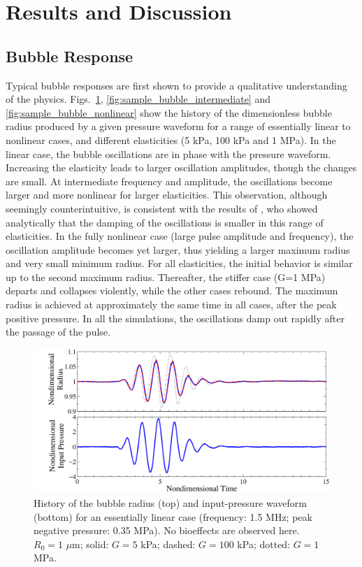  


\section{Results and Discussion}
\label{sec:usbe_bubble_results}

\subsection{Bubble Response}

Typical bubble responses are first shown to provide a qualitative
understanding of the physics.  Figs.~\ref{fig:sample_bubble_linear},
\ref{fig:sample_bubble_intermediate} and
\ref{fig:sample_bubble_nonlinear} show the history of the
dimensionless bubble radius produced by a given pressure waveform for
a range of essentially linear to nonlinear cases, and different
elasticities (5 kPa, 100 kPa and 1 MPa). In the linear case, the
bubble oscillations are in phase with the pressure
waveform. Increasing the elasticity leads to larger oscillation
amplitudes, though the changes are small. At intermediate frequency
and amplitude, the oscillations become larger and more nonlinear for
larger elasticities. This observation, although seemingly
counterintuitive, is consistent with the results of
\cite{johnsen2012}, who showed analytically that the damping of the
oscillations is smaller in this range of elasticities.  In the fully
nonlinear case (large pulse amplitude and frequency), the oscillation
amplitude becomes yet larger, thus yielding a larger maximum radius
and very small minimum radius.  For all elasticities, the initial
behavior is similar up to the second maximum radius. Thereafter, the
stiffer case (G=1 MPa) departs and collapses violently, while the
other cases rebound. The maximum radius is achieved at approximately
the same time in all cases, after the peak positive pressure. In all
the simulations, the oscillations damp out rapidly after the passage
of the pulse.

\begin{figure}[!t]
  \centering \includegraphics[width=\textwidth]{figs/bubble_figs/Rt_linear}
  \caption{History of the bubble radius (top) and input-pressure
    waveform (bottom) for an essentially linear case (frequency: 1.5
    MHz; peak negative pressure: 0.35 MPa). No bioeffects are observed
    here. $R_0=1$ $\mu$m; solid: $G=5$ kPa; dashed: $G=100$ kPa;
    dotted: $G=1$ MPa.}
  \label{fig:sample_bubble_linear}
\end{figure}

